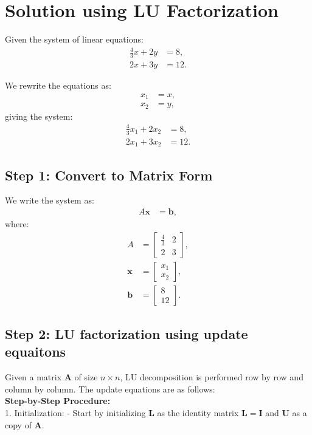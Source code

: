 \documentclass[journal]{IEEEtran}
\begin{document}
	\section*{Solution using LU Factorization}
	
	Given the system of linear equations:
	\begin{align}
		\frac{4}{3}x + 2y &= 8, \label{eq1} \\
		2x + 3y &= 12. \label{eq2}
	\end{align}
	
	We rewrite the equations as:
	\begin{align}
		x_1 &= x, \\
		x_2 &= y,
	\end{align}
	giving the system:
	\begin{align}
		\frac{4}{3}x_1 + 2x_2 &= 8, \label{eq3} \\
		2x_1 + 3x_2 &= 12. \label{eq4}
	\end{align}
	
	\subsection*{Step 1: Convert to Matrix Form}
	We write the system as:
	\begin{align}
		A \mathbf{x} &= \mathbf{b},
	\end{align}
	where:
	\begin{align}
		A &= \begin{bmatrix} \frac{4}{3} & 2 \\ 2 & 3 \end{bmatrix}, \\
		\mathbf{x} &= \begin{bmatrix} x_1 \\ x_2 \end{bmatrix}, \\
		\mathbf{b} &= \begin{bmatrix} 8 \\ 12 \end{bmatrix}.
	\end{align}
	\subsection*{Step 2: LU factorization using update equaitons}
	Given a matrix $ \mathbf{A} $ of size $ n \times n $, LU decomposition is performed row by row and column by column. The update equations are as follows:\\
	\textbf{Step-by-Step Procedure:}\\
	1. Initialization: 
	- Start by initializing $ \mathbf{L} $ as the identity matrix $ \mathbf{L} = \mathbf{I} $ and $ \mathbf{U} $ as a copy of $ \mathbf{A} $.
	
\end{document}
